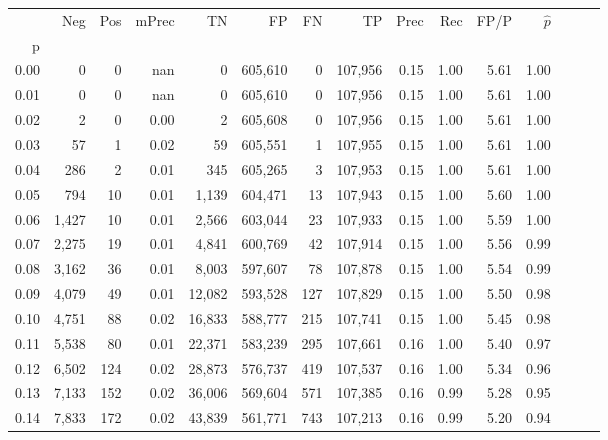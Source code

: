 \begin{tabular}{rrrrrrrrrrrrrrr}
\toprule
{} &     Neg &    Pos & mPrec &       TN &       FP &       FN &       TP &  Prec &   Rec &  FP/P & $\hat{p}$ \\
p    &         &        &       &          &          &          &          &       &       &       &           \\
\midrule
0.00 &       0 &      0 &   nan &        0 &  605,610 &        0 &  107,956 &  0.15 &  1.00 &  5.61 &      1.00 \\
0.01 &       0 &      0 &   nan &        0 &  605,610 &        0 &  107,956 &  0.15 &  1.00 &  5.61 &      1.00 \\
0.02 &       2 &      0 &  0.00 &        2 &  605,608 &        0 &  107,956 &  0.15 &  1.00 &  5.61 &      1.00 \\
0.03 &      57 &      1 &  0.02 &       59 &  605,551 &        1 &  107,955 &  0.15 &  1.00 &  5.61 &      1.00 \\
0.04 &     286 &      2 &  0.01 &      345 &  605,265 &        3 &  107,953 &  0.15 &  1.00 &  5.61 &      1.00 \\
0.05 &     794 &     10 &  0.01 &    1,139 &  604,471 &       13 &  107,943 &  0.15 &  1.00 &  5.60 &      1.00 \\
0.06 &   1,427 &     10 &  0.01 &    2,566 &  603,044 &       23 &  107,933 &  0.15 &  1.00 &  5.59 &      1.00 \\
0.07 &   2,275 &     19 &  0.01 &    4,841 &  600,769 &       42 &  107,914 &  0.15 &  1.00 &  5.56 &      0.99 \\
0.08 &   3,162 &     36 &  0.01 &    8,003 &  597,607 &       78 &  107,878 &  0.15 &  1.00 &  5.54 &      0.99 \\
0.09 &   4,079 &     49 &  0.01 &   12,082 &  593,528 &      127 &  107,829 &  0.15 &  1.00 &  5.50 &      0.98 \\
0.10 &   4,751 &     88 &  0.02 &   16,833 &  588,777 &      215 &  107,741 &  0.15 &  1.00 &  5.45 &      0.98 \\
0.11 &   5,538 &     80 &  0.01 &   22,371 &  583,239 &      295 &  107,661 &  0.16 &  1.00 &  5.40 &      0.97 \\
0.12 &   6,502 &    124 &  0.02 &   28,873 &  576,737 &      419 &  107,537 &  0.16 &  1.00 &  5.34 &      0.96 \\
0.13 &   7,133 &    152 &  0.02 &   36,006 &  569,604 &      571 &  107,385 &  0.16 &  0.99 &  5.28 &      0.95 \\
0.14 &   7,833 &    172 &  0.02 &   43,839 &  561,771 &      743 &  107,213 &  0.16 &  0.99 &  5.20 &      0.94 \\

\end{tabular}
